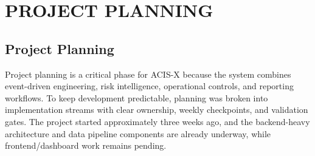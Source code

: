 \documentclass[a4paper, 12pt]{report}
\begin{document}
\chapter{PROJECT PLANNING}

\section{Project Planning}

Project planning is a critical phase for ACIS-X because the system combines event-driven engineering, risk intelligence, operational controls, and reporting workflows. To keep development predictable, planning was broken into implementation streams with clear ownership, weekly checkpoints, and validation gates. The project started approximately three weeks ago, and the backend-heavy architecture and data pipeline components are already underway, while frontend/dashboard work remains pending.
\end{document}
